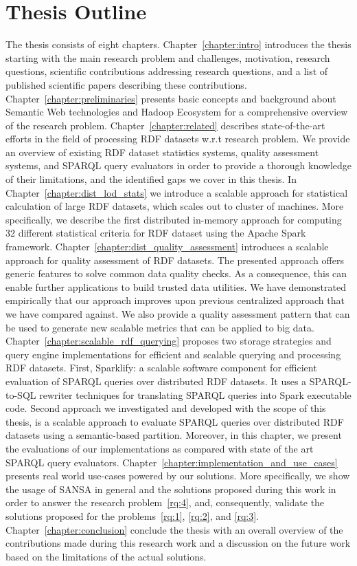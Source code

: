 \section{Thesis Outline}
\label{sec:thesis-outline}
The thesis consists of eight chapters.
Chapter~\ref{chapter:intro} introduces the thesis starting with the main research problem and challenges, motivation, research questions, scientific contributions addressing research questions, and a list of published scientific papers describing these contributions.
Chapter~\ref{chapter:preliminaries} presents basic concepts and background about Semantic Web technologies and Hadoop Ecosystem for a comprehensive overview of the research problem. 
Chapter~\ref{chapter:related} describes state-of-the-art efforts in the field of processing \gls{RDF} datasets w.r.t research problem.
We provide an overview of existing RDF dataset statistics systems, quality assessment systems, and \gls{SPARQL} query evaluators in order to provide a thorough knowledge of their limitations, and the identified gaps we cover in this thesis.
In Chapter~\ref{chapter:dist_lod_stats} we introduce a scalable approach for statistical calculation of large \gls{RDF} datasets, which scales out to cluster of machines.
More specifically, we describe the first distributed in-memory approach for computing 32 different statistical criteria for \gls{RDF} dataset using the Apache Spark framework.
Chapter~\ref{chapter:dist_quality_assessment} introduces a scalable approach for quality assessment of \gls{RDF} datasets.
The presented approach offers generic features to solve common data quality checks.
As a consequence, this can enable further applications to build trusted data utilities.
We have demonstrated empirically that our approach improves upon previous centralized approach that we have compared against.
We also provide a quality assessment pattern that can be used to generate new scalable metrics that can be applied to big data.
Chapter~\ref{chapter:scalable_rdf_querying} proposes two storage strategies and query engine implementations for efficient and scalable querying and processing \gls{RDF} datasets.
First, Sparklify: a scalable software component for efficient evaluation of SPARQL queries over distributed \gls{RDF} datasets. 
It uses a SPARQL-to-SQL rewriter techniques for translating \gls{SPARQL} queries into Spark executable code.
Second approach we investigated and developed with the scope of this thesis, is a scalable approach to evaluate \gls{SPARQL} queries over distributed \gls{RDF} datasets using a semantic-based partition.
Moreover, in this chapter, we present the evaluations of our implementations as compared with state of the art \gls{SPARQL} query evaluators.
Chapter~\ref{chapter:implementation_and_use_cases} presents real world use-cases powered by our solutions. 
More specifically, we show the usage of SANSA in general and the solutions proposed during this work in order to answer the research problem~\ref{rq:4}, and, consequently, validate the solutions proposed for the problems~\ref{rq:1}, \ref{rq:2}, and \ref{rq:3}.
Chapter~\ref{chapter:conclusion} conclude the thesis with an overall overview of the contributions made during this research work and a discussion on the future work based on the limitations of the actual solutions. 
